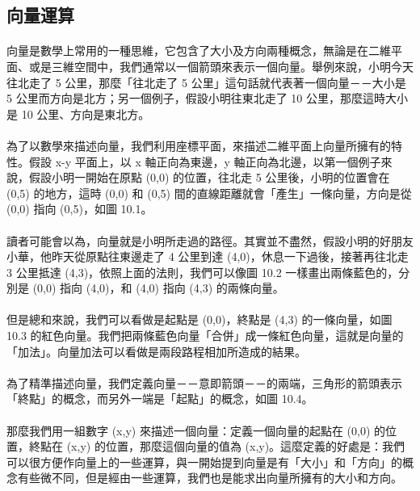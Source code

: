 \documentclass[12pt,a4paper,oneside]{report}
\begin{document}
\begin{CJK}{UTF8}{bkai}
\subsection{向量運算}

\paragraph{}向量是數學上常用的一種思維，它包含了大小及方向兩種概念，無論是在二維平面、或是三維空間中，我們通常以一個箭頭來表示一個向量。舉例來說，小明今天往北走了 5 公里，那麼「往北走了 5 公里」這句話就代表著一個向量－－大小是 5 公里而方向是北方；另一個例子，假設小明往東北走了 10 公里，那麼這時大小是 10 公里、方向是東北方。
\paragraph{}為了以數學來描述向量，我們利用座標平面，來描述二維平面上向量所擁有的特性。假設 x-y 平面上，以 x 軸正向為東邊，y 軸正向為北邊，以第一個例子來說，假設小明一開始在原點 (0,0) 的位置，往北走 5 公里後，小明的位置會在 (0,5) 的地方，這時 (0,0) 和 (0,5) 間的直線距離就會「產生」一條向量，方向是從 (0,0) 指向 (0,5)，如圖 10.1。
\paragraph{}讀者可能會以為，向量就是小明所走過的路徑。其實並不盡然，假設小明的好朋友小華，他昨天從原點往東邊走了 4 公里到達 (4,0)，休息一下過後，接著再往北走 3 公里抵達 (4,3)，依照上面的法則，我們可以像圖 10.2 一樣畫出兩條藍色的，分別是 (0,0) 指向 (4,0)，和 (4,0) 指向 (4,3) 的兩條向量。
\paragraph{}但是總和來說，我們可以看做是起點是 (0,0)，終點是 (4,3) 的一條向量，如圖 10.3 的紅色向量。我們把兩條藍色向量「合併」成一條紅色向量，這就是向量的「加法」。向量加法可以看做是兩段路程相加所造成的結果。
\paragraph{}為了精準描述向量，我們定義向量－－意即箭頭－－的兩端，三角形的箭頭表示「終點」的概念，而另外一端是「起點」的概念，如圖 10.4。
\paragraph{}那麼我們用一組數字 (x,y) 來描述一個向量：定義一個向量的起點在 (0,0) 的位置，終點在 (x,y) 的位置，那麼這個向量的值為 (x,y)。這麼定義的好處是：我們可以很方便作向量上的一些運算，與一開始提到向量是有「大小」和「方向」的概念有些微不同，但是經由一些運算，我們也是能求出向量所擁有的大小和方向。

\end{CJK}
\end{document}
